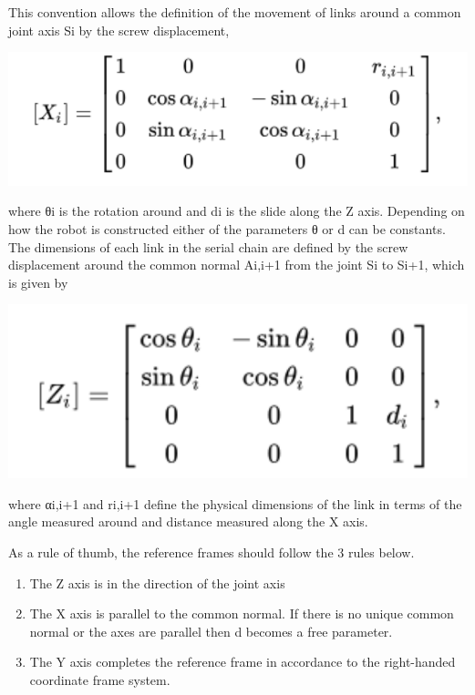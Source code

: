     This convention allows the definition of the movement of links around a common joint axis Si by the screw displacement,
    \begin{center}
    \includegraphics[width=150mm]{xframe.PNG}
    \end{center}
    where θi is the rotation around and di is the slide along the Z axis. Depending on how the robot is constructed either of the parameters θ or d can be constants. The dimensions of each link in the serial chain are defined by the screw displacement around the common normal Ai,i+1 from the joint Si to Si+1, which is given by
    \begin{center}
    \includegraphics[width=150mm]{zframe.PNG}
    \end{center}
    where αi,i+1 and ri,i+1 define the physical dimensions of the link in terms of the angle measured around and distance measured along the X axis. 
    
    As a rule of thumb, the reference frames should follow the 3 rules below.
    \begin{enumerate}
        \item The Z axis is in the direction of the joint axis
        \item The X axis is parallel to the common normal. If there is no unique common normal or the axes are parallel then d becomes a free parameter.
        \item The Y axis completes the reference frame in accordance to the right-handed coordinate frame system.
    \end{enumerate}
    
